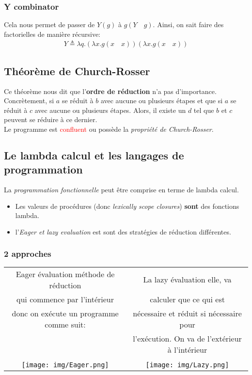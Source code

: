 \documentclass{report}
\begin{document}
\subsubsection{Y combinator}
Cela nous permet de passer de $Y(g)$ à $g(Y \quad g)$. Ainsi, on sait faire des factorielles de manière récursive:
\begin{align*}
Y \triangleq \lambda q.(\lambda x.g (x \quad x)) (\lambda x.g(x \quad x))
\end{align*}

\subsection{Théorème de Church-Rosser}
Ce théorème nous dit que l'\textbf{ordre de réduction} n'a pas d'importance.\\
Concrètement, si $a$ se réduit à $b$ avec aucune ou plusieurs étapes et que si $a$ se réduit à $c$ avec aucune ou plusieurs étapes. Alors, il existe un $d$ tel que $b$ et $c$ peuvent se réduire à ce dernier.\\
Le programme est \textcolor{red}{confluent} ou possède la \textit{propriété de Church-Rosser}.

\subsection{Le lambda calcul et les langages de programmation}
La \textit{programmation fonctionnelle} peut être comprise en terme de lambda calcul.
\begin{itemize}
\item Les valeurs de procédures (donc \textit{lexically scope closures}) \textbf{sont} des fonctions lambda.
\item l'\textit{Eager et lazy evaluation} est sont des stratégies de réduction différentes.
\end{itemize}

\subsubsection{2 approches}
\begin{tabular}{|c|c|}
Eager évaluation méthode de réduction & La lazy évaluation elle, va\\
qui commence par l'intérieur & calculer que ce qui est \\
 donc on exécute un programme comme suit: &  nécessaire et réduit si nécessaire pour \\
 & l'exécution. On va de l'extérieur à l'intérieur\\
  & \\
\texttt{[image: img/Eager.png]} & \texttt{[image: img/Lazy.png]}
\end{tabular}
\end{document}
